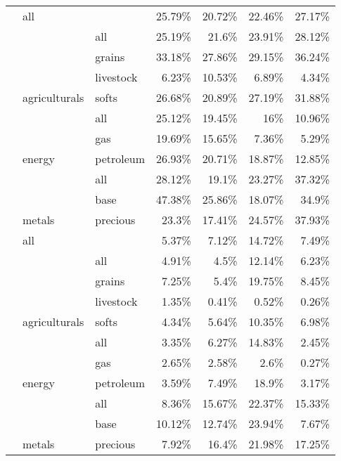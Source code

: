 \documentclass[]{elsarticle} %
\begin{document}
\begin{longtable}[t]{>{}lllrrrr}
\endfoot
\bottomrule
\endlastfoot
 & all &  & 25.79\% & 20.72\% & 22.46\% & 27.17\%\\
\nopagebreak
 &  & \multirow[t]{-2}{*}{\raggedright\arraybackslash all} & 25.19\% & 21.6\% & 23.91\% & 28.12\%\\
\nopagebreak
 &  & grains & 33.18\% & 27.86\% & 29.15\% & 36.24\%\\
\nopagebreak
 &  & livestock & 6.23\% & 10.53\% & 6.89\% & 4.34\%\\
\nopagebreak
 & \multirow[t]{-4}{*}{\raggedright\arraybackslash agriculturals} & softs & 26.68\% & 20.89\% & 27.19\% & 31.88\%\\
\nopagebreak
 &  & all & 25.12\% & 19.45\% & 16\% & 10.96\%\\
\nopagebreak
 &  & gas & 19.69\% & 15.65\% & 7.36\% & 5.29\%\\
\nopagebreak
 & \multirow[t]{-3}{*}{\raggedright\arraybackslash energy} & petroleum & 26.93\% & 20.71\% & 18.87\% & 12.85\%\\
\nopagebreak
 &  & all & 28.12\% & 19.1\% & 23.27\% & 37.32\%\\
\nopagebreak
 &  & base & 47.38\% & 25.86\% & 18.07\% & 34.9\%\\
\nopagebreak
\multirow[t]{-11}{*}{\raggedright\arraybackslash \textbf{Δ\% commodity CHP}} & \multirow[t]{-3}{*}{\raggedright\arraybackslash metals} & precious & 23.3\% & 17.41\% & 24.57\% & 37.93\%\\
\cmidrule{1-7}\pagebreak[0]
 & all &  & 5.37\% & 7.12\% & 14.72\% & 7.49\%\\
\nopagebreak
 &  & \multirow[t]{-2}{*}{\raggedright\arraybackslash all} & 4.91\% & 4.5\% & 12.14\% & 6.23\%\\
\nopagebreak
 &  & grains & 7.25\% & 5.4\% & 19.75\% & 8.45\%\\
\nopagebreak
 &  & livestock & 1.35\% & 0.41\% & 0.52\% & 0.26\%\\
\nopagebreak
 & \multirow[t]{-4}{*}{\raggedright\arraybackslash agriculturals} & softs & 4.34\% & 5.64\% & 10.35\% & 6.98\%\\
\nopagebreak
 &  & all & 3.35\% & 6.27\% & 14.83\% & 2.45\%\\
\nopagebreak
 &  & gas & 2.65\% & 2.58\% & 2.6\% & 0.27\%\\
\nopagebreak
 & \multirow[t]{-3}{*}{\raggedright\arraybackslash energy} & petroleum & 3.59\% & 7.49\% & 18.9\% & 3.17\%\\
\nopagebreak
 &  & all & 8.36\% & 15.67\% & 22.37\% & 15.33\%\\
\nopagebreak
 &  & base & 10.12\% & 12.74\% & 23.94\% & 7.67\%\\
\nopagebreak
\multirow[t]{-11}{*}{\raggedright\arraybackslash \textbf{Δ\% aggregate CHP}} & \multirow[t]{-3}{*}{\raggedright\arraybackslash metals} & precious & 7.92\% & 16.4\% & 21.98\% & 17.25\%\\*
\end{longtable}
\endgroup{}
\end{document}
